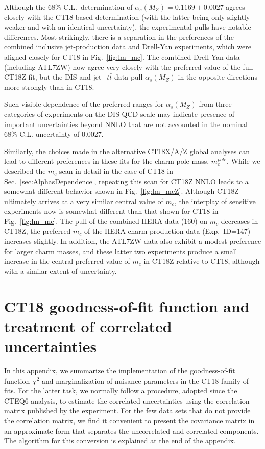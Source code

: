 Although the $68\%$ C.L.~determination of $\alpha_s(M_Z)\! =\!
0.1169\! \pm\! 0.0027$ agrees closely with the CT18-based
determination (with the latter being only slightly weaker and with an
identical uncertainty), the experimental pulls have notable
differences. Most strikingly, there is a separation in the preferences
of the combined inclusive jet-production data and Drell-Yan experiments,
which were aligned closely for CT18 in Fig.~\ref{fig:lm_mc}. The
combined Drell-Yan data (including ATL7ZW) now agree very closely with
the preferred value of the full CT18Z fit, but the DIS and
jet+$t\bar{t}$ data pull $\alpha_s(M_Z)$ in the opposite directions
more strongly than in CT18.

Such visible dependence of the preferred ranges for $\alpha_s(M_Z)$
from three categories of experiments on the DIS QCD scale may
indicate presence of important uncertainties beyond NNLO that are not
accounted in the nominal 68\% C.L. uncertainty of 0.0027.

%
Similarly, the choices made in the alternative CT18X/A/Z global
analyses can lead to different preferences in these fits for the
charm pole mass, $m_c^{pole}$.
While we described the $m_c$ scan in detail 
in the case of CT18 in Sec.~\ref{sec:AlphasDependence},
repeating this scan for CT18Z NNLO leads to a somewhat different
behavior shown in Fig.~\ref{fig:lm_mcZ}.
Although CT18Z ultimately arrives at a very similar central value of
$m_c$, the interplay of sensitive
experiments now is somewhat different than that
shown for CT18 in Fig.~\ref{fig:lm_mc}.
The pull of the combined HERA data (160) on $m_c$
decreases in CT18Z, the preferred $m_c$
of the HERA charm-production data (Exp.~ID=147)
increases slightly. In addition, the ATL7ZW data
also exhibit a modest preference for larger charm masses, and
these latter two experiments produce a small increase in the
central preferred value of $m_c$ in CT18Z relative to CT18,
although with a similar extent of uncertainty.


\clearpage

\section{CT18 goodness-of-fit function and treatment of correlated uncertainties}
\label{sec:chi2_app}
%
%
\newcommand{\betamat}{b}

In this appendix, we summarize the implementation of the
goodness-of-fit function $\chi^2$ and marginalization of nuisance
parameters in the CT18 family of fits. For the latter task, we
normally follow a procedure, adopted since the CTEQ6 analysis, to
estimate the correlated uncertainties using the correlation matrix
published by the experiment. For the few data sets that do not provide
the correlation matrix, we find it convenient to present the
covariance matrix in an approximate form that separates the
uncorrelated and correlated components. The algorithm for this
conversion is explained at the end of the appendix.   


